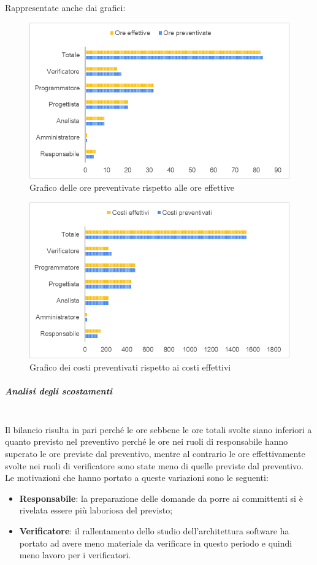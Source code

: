 Rappresentate anche dai grafici:
\begin{figure} [H]
	\includegraphics[width=\linewidth]{./img/Grafici/33.png}
	\caption{Grafico delle ore preventivate rispetto alle ore effettive}
\end{figure}

\begin{figure} [H]
	\includegraphics[width=\linewidth]{./img/Grafici/34.png}
	\caption{Grafico dei costi preventivati rispetto ai costi effettivi}
\end{figure}

\subparagraph*{Analisi degli scostamenti} \mbox{} \\
Il bilancio risulta in pari perché le ore sebbene le ore totali svolte siano inferiori a quanto previsto nel preventivo perché le ore nei ruoli di responsabile hanno superato le ore previste dal preventivo, mentre al contrario le ore effettivamente svolte nei ruoli di verificatore sono state meno di quelle previste dal preventivo.
Le motivazioni che hanno portato a queste variazioni sono le seguenti:
\begin{itemize}
	\item \textbf{Responsabile}: la preparazione delle domande da porre ai committenti si è rivelata essere più laboriosa del previsto;
	\item \textbf{Verificatore}: il rallentamento dello studio dell'architettura software ha portato ad avere meno materiale da verificare in questo periodo e quindi meno lavoro per i verificatori.
\end{itemize}

